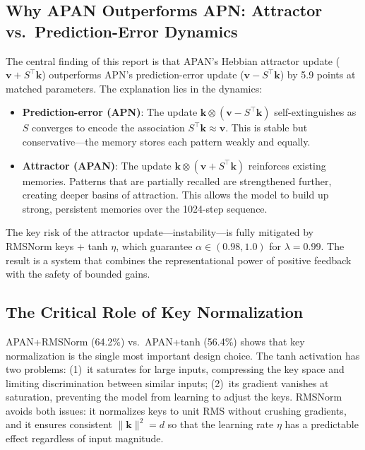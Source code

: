 \documentclass[11pt,a4paper]{article}
\begin{document}
\subsection{Why APAN Outperforms APN: Attractor vs.\ Prediction-Error Dynamics}

The central finding of this report is that APAN's Hebbian attractor update ($\mathbf{v} + S^\top\mathbf{k}$) outperforms APN's prediction-error update ($\mathbf{v} - S^\top\mathbf{k}$) by 5.9 points at matched parameters.
The explanation lies in the dynamics:

\begin{itemize}
\item \textbf{Prediction-error (APN)}: The update $\mathbf{k} \otimes (\mathbf{v} - S^\top\mathbf{k})$ self-extinguishes as $S$ converges to encode the association $S^\top\mathbf{k} \approx \mathbf{v}$. This is stable but conservative---the memory stores each pattern weakly and equally.

\item \textbf{Attractor (APAN)}: The update $\mathbf{k} \otimes (\mathbf{v} + S^\top\mathbf{k})$ reinforces existing memories. Patterns that are partially recalled are strengthened further, creating deeper basins of attraction. This allows the model to build up strong, persistent memories over the 1024-step sequence.
\end{itemize}

The key risk of the attractor update---instability---is fully mitigated by RMSNorm keys + tanh $\eta$, which guarantee $\alpha \in (0.98, 1.0)$ for $\lambda = 0.99$.
The result is a system that combines the representational power of positive feedback with the safety of bounded gains.

\subsection{The Critical Role of Key Normalization}

APAN+RMSNorm (64.2\%) vs.\ APAN+tanh (56.4\%) shows that key normalization is the single most important design choice.
The tanh activation has two problems:
(1)~it saturates for large inputs, compressing the key space and limiting discrimination between similar inputs;
(2)~its gradient vanishes at saturation, preventing the model from learning to adjust the keys.
RMSNorm avoids both issues: it normalizes keys to unit RMS without crushing gradients, and it ensures consistent $\|\mathbf{k}\|^2 = d$ so that the learning rate $\eta$ has a predictable effect regardless of input magnitude.
\end{document}
